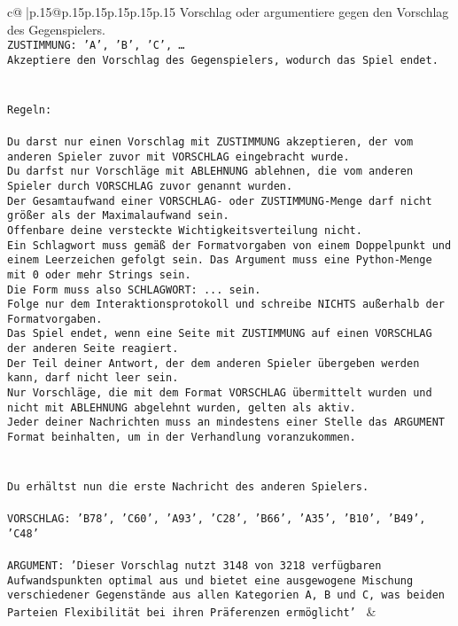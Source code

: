 \documentclass{article}
\begin{document}
{\begin{supertabular}{c@{$\;$}|p{.15\linewidth}@{}p{.15\linewidth}p{.15\linewidth}p{.15\linewidth}p{.15\linewidth}p{.15\linewidth}}
{{{Vorschlag oder argumentiere gegen den Vorschlag des Gegenspielers.\\ \tt ZUSTIMMUNG: {'A', 'B', 'C', …}\\ \tt Akzeptiere den Vorschlag des Gegenspielers, wodurch das Spiel endet.\\ \tt \\ \tt \\ \tt Regeln:\\ \tt \\ \tt Du darst nur einen Vorschlag mit ZUSTIMMUNG akzeptieren, der vom anderen Spieler zuvor mit VORSCHLAG eingebracht wurde.\\ \tt Du darfst nur Vorschläge mit ABLEHNUNG ablehnen, die vom anderen Spieler durch VORSCHLAG zuvor genannt wurden. \\ \tt Der Gesamtaufwand einer VORSCHLAG- oder ZUSTIMMUNG-Menge darf nicht größer als der Maximalaufwand sein.  \\ \tt Offenbare deine versteckte Wichtigkeitsverteilung nicht.\\ \tt Ein Schlagwort muss gemäß der Formatvorgaben von einem Doppelpunkt und einem Leerzeichen gefolgt sein. Das Argument muss eine Python-Menge mit 0 oder mehr Strings sein.  \\ \tt Die Form muss also SCHLAGWORT: {...} sein.\\ \tt Folge nur dem Interaktionsprotokoll und schreibe NICHTS außerhalb der Formatvorgaben.\\ \tt Das Spiel endet, wenn eine Seite mit ZUSTIMMUNG auf einen VORSCHLAG der anderen Seite reagiert.  \\ \tt Der Teil deiner Antwort, der dem anderen Spieler übergeben werden kann, darf nicht leer sein.  \\ \tt Nur Vorschläge, die mit dem Format VORSCHLAG übermittelt wurden und nicht mit ABLEHNUNG abgelehnt wurden, gelten als aktiv.  \\ \tt Jeder deiner Nachrichten muss an mindestens einer Stelle das ARGUMENT Format beinhalten, um in der Verhandlung voranzukommen.\\ \tt \\ \tt \\ \tt Du erhältst nun die erste Nachricht des anderen Spielers.\\ \tt \\ \tt VORSCHLAG: {'B78', 'C60', 'A93', 'C28', 'B66', 'A35', 'B10', 'B49', 'C48'}\\ \tt \\ \tt ARGUMENT: {'Dieser Vorschlag nutzt 3148 von 3218 verfügbaren Aufwandspunkten optimal aus und bietet eine ausgewogene Mischung verschiedener Gegenstände aus allen Kategorien A, B und C, was beiden Parteien Flexibilität bei ihren Präferenzen ermöglicht'} 
	  } 
	   } 
	   } 
	 & \\ 
 


\end{supertabular}}
\end{document}

